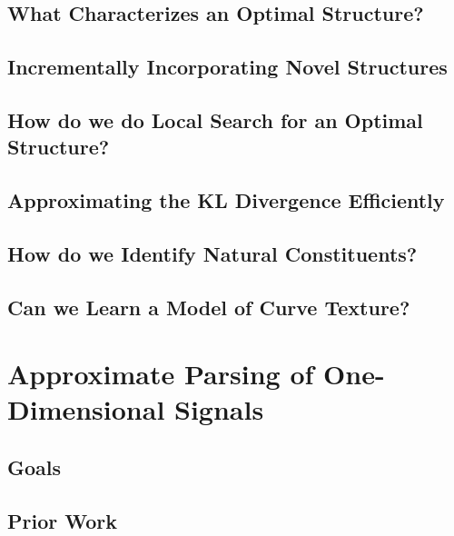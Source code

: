 \documentclass{tufte-book}
\begin{document}
  \section{What Characterizes an Optimal Structure?} 
    

  \section{Incrementally Incorporating Novel Structures}

  \section{How do we do Local Search for an Optimal Structure?}
    

  \section{Approximating the KL Divergence Efficiently}
    

  \section{How do we Identify Natural Constituents?}
    
    

  \section{Can we Learn a Model of Curve Texture?}
    

\chapter{Approximate Parsing of One-Dimensional Signals}

  \section{Goals}
    

  \section{Prior Work}
\end{document}
